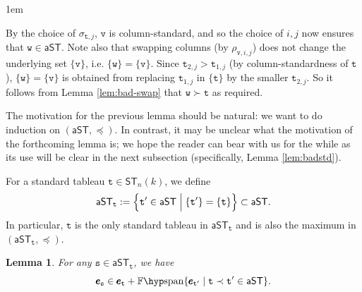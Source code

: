 \documentclass[a4paper]{amsart}
\makeatletter
\numberwithin{equation}{subsection}
\newtheorem{lemma}[theorem]{Lemma}
\theoremstyle{definition}
\newcommand{\bfe}{\pmb{e}}
\newcommand{\tbx}{\mathtt{t}}
\newcommand{\aST}{\mathsf{aST}}
\newcommand{\tbs}{\mathtt{s}}
\newcommand{\ST}{\mathsf{ST}}
\newcommand{\Fspan}{\mathbb{F}\hyp\mathrm{span}}
\renewenvironment{proof}[1][\proofname]{\par
	\pushQED{\qed}%
	\normalfont \topsep0\p@\@plus6\p@ \labelsep1em\relax
	\trivlist
	\item[\hskip\labelsep\bfseries #1]\ignorespaces
	\mbox{}%
}{
	\popQED\endtrivlist\@endpefalse
}
\numberwithin{equation}{subsection}
\makeatother
\begin{document}
\begin{proof}
By the choice of $\sigma_{\tbx,j}$, $\mathtt{v}$ is column-standard, and so the choice of $i,j$ now ensures that $\mathtt{w}\in \aST$.  Note also that swapping columns (by $\rho_{\mathtt{v},i,j}$) does not change the underlying set $\{\mathtt{v}\}$, i.e. $\{\mathtt{w}\}=\{\mathtt{v}\}$.
Since $\tbx_{2,j}>\tbx_{1,j}$ (by column-standardness of $\tbx$), $\{\mathtt{w}\}=\{\mathtt{v}\}$ is obtained from replacing $\tbx_{1,j}$ in $\{\tbx\}$ by the smaller $\tbx_{2,j}$.
So it follows from Lemma \ref{lem:bad-swap} that $\mathtt{w}\succ \tbx$ as required.%
\end{proof}

The motivation for the previous lemma should be natural: we want to do induction on $(\aST, \preceq)$.  In contrast, it may be unclear what the motivation of the forthcoming lemma is; we hope the reader can bear with us for the while as its use will be clear in the next subsection (specifically, Lemma \ref{lem:badstd}).

For a standard tableau $\tbx\in \ST_n(k)$, we define 
\[
\aST_\tbx:=\Bigl\{ \tbx' \in \aST \Bigm| \{\tbx'\}=\{\tbx\} \Bigr\} \subset \aST.
\]
In particular, $\tbx$ is the only standard tableau in $\aST_{\tbx}$ and is also the maximum in $(\aST_{\tbx}, \preceq)$.
\begin{lemma}\label{lem:nonstd2}
For any $\tbs\in \aST_\tbx$, we have 
\[
\bfe_{\tbs} \in \bfe_{\tbx}+\Fspan\{\bfe_{\tbx'}\mid  \tbx \prec \tbx'\in \aST \}.
\]
\end{lemma}
\end{document}
